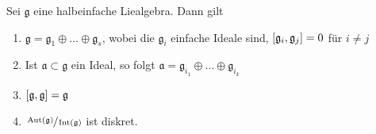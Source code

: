 \begin{satz}[label=satz:222]
	Sei $\mathfrak{g}$ eine halbeinfache Liealgebra.
	Dann gilt
	\begin{enumerate}[1)]
		\item $\mathfrak{g} = \mathfrak{g}_1 \oplus  \ldots \oplus \mathfrak{g}_s$, wobei die $\mathfrak{g}_i$ einfache Ideale sind, $\benbrace*{\mathfrak{g}_i,\mathfrak{g}_j}=0$ für $i \neq j$
		\item Ist $\mathfrak{a} \subset \mathfrak{g}$ ein Ideal, so folgt $\mathfrak{a} = \mathfrak{g}_{i_1} \oplus  \ldots \oplus \mathfrak{g}_{i_k}$
		\item $\benbrace*{\mathfrak{g},\mathfrak{g}}=\mathfrak{g}$
		\item $\sfrac{\Aut(\mathfrak{g})}{\Int(\mathfrak{g})}$ ist diskret.
	\end{enumerate}
\end{satz}
